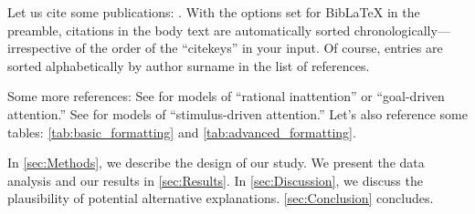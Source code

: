 Let us cite some publications: \cite{Andersen2008, Andreoni2012, Balakrishnan2016, Koszegi2013}. With the options set for BibLaTeX in the preamble, citations in the body text are automatically sorted chronologically---irrespective of the order of the ``citekeys'' in your input. Of course, entries are sorted alphabetically by author surname in the list of references.

\Blindtext[3]

Some more references: See \cite{Sims2003, Gabaix2014} for models of ``rational inattention'' or ``goal-driven attention.'' See \cite{Bordalo2012, Bordalo2013, Koszegi2013, Taubinsky2014, Bushong2016} for models of ``stimulus-driven attention.'' Let's also reference some tables: \autoref{tab:basic_formatting} and \autoref{tab:advanced_formatting}.

\blindmathtrue

\Blindtext[3]

In \autoref{sec:Methods}, we describe the design of our study. We present the data analysis and our results in \autoref{sec:Results}. In \autoref{sec:Discussion}, we discuss the plausibility of potential alternative explanations. \autoref{sec:Conclusion} concludes.